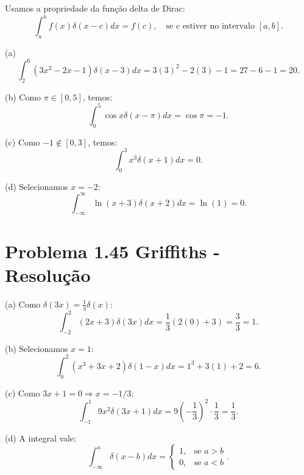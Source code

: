 \documentclass[a4paper,12pt]{article}
\begin{document}
Usamos a propriedade da função delta de Dirac:
\begin{equation}
    \int_{a}^{b} f(x) \delta(x - c) dx = f(c), \quad \text{se } c \text{ estiver no intervalo } [a,b].
\end{equation}

(a) \begin{equation}
    \int_{2}^{6} (3x^2 - 2x - 1) \delta(x - 3) dx = 3(3)^2 - 2(3) - 1 = 27 - 6 - 1 = 20.
\end{equation}

(b) Como $\pi \in [0,5]$, temos:
\begin{equation}
    \int_{0}^{5} \cos x \delta(x - \pi) dx = \cos \pi = -1.
\end{equation}

(c) Como $-1 \notin [0,3]$, temos:
\begin{equation}
    \int_{0}^{3} x^3 \delta(x+1) dx = 0.
\end{equation}

(d) Selecionamos $x = -2$:
\begin{equation}
    \int_{-\infty}^{\infty} \ln (x+3) \delta(x+2) dx = \ln(1) = 0.
\end{equation}

\section*{Problema 1.45 Griffiths - Resolu\c{c}\~ao}

(a) Como $\delta(3x) = \frac{1}{3} \delta(x)$:
\begin{equation}
    \int_{-2}^{2} (2x+3) \delta(3x) dx = \frac{1}{3} (2(0) + 3) = \frac{3}{3} = 1.
\end{equation}

(b) Selecionamos $x = 1$:
\begin{equation}
    \int_{0}^{2} (x^3 + 3x + 2) \delta(1 - x) dx = 1^3 + 3(1) + 2 = 6.
\end{equation}

(c) Como $3x + 1 = 0 \Rightarrow x = -1/3$:
\begin{equation}
    \int_{-1}^{1} 9x^2 \delta(3x+1) dx = 9 \left(-\frac{1}{3}\right)^2 \cdot \frac{1}{3} = \frac{1}{3}.
\end{equation}

(d) A integral vale:
\begin{equation}
    \int_{-\infty}^{a} \delta(x - b) dx = \begin{cases} 1, & \text{se } a > b \\ 0, & \text{se } a < b \end{cases}.
\end{equation}
\end{document}
